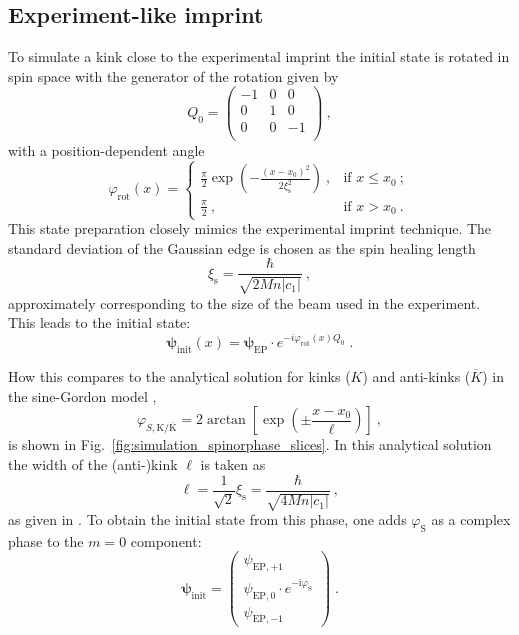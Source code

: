 \documentclass[aps,

               pra,
               twocolumn,
               amsmath,
               amssymb,
               superscriptaddress,
               reprint,
               10pt
              ]{revtex4-2}
\newcommand{\phis}{\varphi_\mathrm{S}}
\begin{document}
\begin{appendix}
\subsection{Experiment-like imprint}
To simulate a kink close to the experimental imprint the initial state is rotated in spin space with the generator of the rotation given by
\begin{equation}
    Q_0 = \begin{pmatrix}
        -1 & 0 & 0 \\
        0 & 1 & 0 \\
        0 & 0 & -1 \\
    \end{pmatrix} \:,
\end{equation}
with a position-dependent angle
\begin{equation}
    \varphi_\mathrm{rot}(x) = \begin{cases}\frac{\pi}{2} \exp(-\frac{\left(x-x_0\right)^2}{2\xi_\mathrm{s}^2}) \:,& \text{if } x\leq x_0 \:; \\
    \frac{\pi}{2} \:,& \text{if } x > x_0 \:.
    \end{cases}
    \label{eq:kink_simulation}
\end{equation}
This state preparation closely mimics the experimental imprint technique. The standard deviation of the Gaussian edge is chosen as the spin healing length
\begin{equation}
    \xi_\mathrm{s} = \frac{\hbar}{\sqrt{2Mn|c_1|}}\:,
\end{equation}
approximately corresponding to the size of the beam used in the experiment.
This leads to the initial state:
\begin{equation}
    \boldsymbol{\psi}_\mathrm{init}(x) = \boldsymbol{\psi}_\mathrm{EP}\cdot e^{-i\varphi_\mathrm{rot}(x)Q_0} \; .
\end{equation}

How this compares to the analytical solution for kinks ($K$) and anti-kinks ($\overline{K}$) in the sine-Gordon model \cite{Cuevas-Maraver2014},
\begin{equation}
    \varphi_{S,\mathrm{K}/\overline{\mathrm{K}}} = 2\arctan\left[\exp\left(\pm \frac{x-x_0}{\ell}\right)\right]\: ,
    \label{eq:kink_analytics}
\end{equation}
is shown in Fig.~\ref{fig:simulation_spinorphase_slices}. In this analytical solution the width of the (anti-)kink $\ell$ is taken as
\begin{equation}
    \ell = \frac{1}{\sqrt{2}}\xi_\mathrm{s} = \frac{\hbar}{\sqrt{4Mn|c_1|}}\:,
\end{equation}
as given in \cite{Yu2021}.
To obtain the initial state from this phase, one adds $\phis$ as a  complex phase to the $m=0$ component:
\begin{equation}
    \boldsymbol{\psi}_\mathrm{init} = \begin{pmatrix}
        \psi_{\mathrm{EP},+1} \\
        \psi_{\mathrm{EP},0}\cdot e^{-\mathrm{i} \phis} \\
        \psi_{\mathrm{EP},-1}
    \end{pmatrix} \;.
\end{equation}



\end{appendix}
\end{document}
